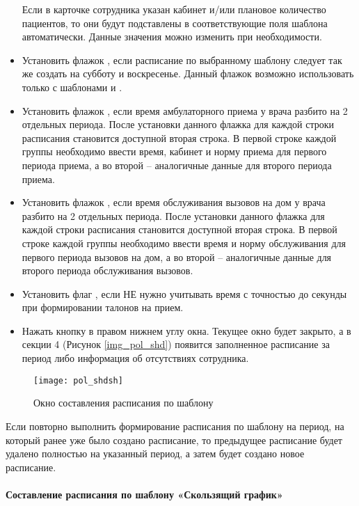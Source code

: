 \begin{itemize}
 Если в карточке сотрудника указан кабинет и/или плановое количество пациентов, то они будут подставлены в соответствующие поля шаблона автоматически. Данные значения можно изменить при необходимости.
 \item Установить флажок , если расписание по выбранному шаблону следует так же создать на субботу и воскресенье. Данный флажок возможно использовать только с шаблонами  и .
 \item Установить флажок , если время амбулаторного приема у врача разбито на 2 отдельных периода. После установки данного флажка для каждой строки расписания становится доступной вторая строка. В первой строке каждой группы необходимо ввести время, кабинет и норму приема для первого периода приема, а во второй – аналогичные данные для второго периода приема.
 \item Установить флажок , если время обслуживания вызовов на дом у врача разбито на 2 отдельных периода. После установки данного флажка для каждой строки расписания становится доступной вторая строка. В первой строке каждой группы необходимо ввести время и норму обслуживания для первого периода вызовов на дом, а во второй – аналогичные данные для второго периода обслуживания вызовов.
 \item Установить флаг , если НЕ нужно учитывать время с точностью до секунды при формировании талонов на прием.
 \item Нажать кнопку   в правом нижнем углу окна. Текущее окно будет закрыто, а в секции 4 (Рисунок \ref{img_pol_shd}) появится заполненное расписание за период либо информация об отсутствиях сотрудника.
\end{itemize}

\begin{figure}[ht]\centering
 \texttt{[image: pol\_shdsh]}
 \caption{Окно составления расписания по шаблону}
 \label{img_pol_shdsh}
\end{figure} 

\begin{prim}
Если повторно выполнить формирование расписания по шаблону на период, на который ранее уже было создано расписание, то предыдущее расписание будет удалено полностью на указанный период, а затем будет создано новое расписание.
\end{prim}

\paragraph{Составление расписания по шаблону «Скользящий график»} \label{pol_shdsg}

